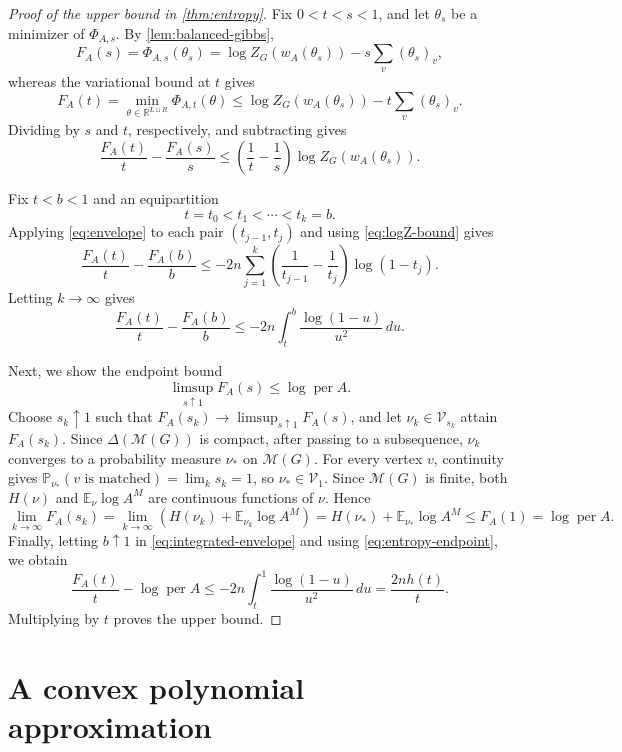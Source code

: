 \documentclass[11pt,reqno,letterpaper]{amsart}
\numberwithin{equation}{section}
\theoremstyle{definition}
\theoremstyle{remark}
\newcommand{\R}{\mathbb R}
\newcommand{\E}{\mathbb E}
\newcommand{\PP}{\mathbb P}
\DeclareMathOperator{\per}{per}
\begin{document}
\begin{proof}[Proof of the upper bound in \cref{thm:entropy}]
Fix $0<t<s<1$, and let $\theta_s$ be a minimizer of
$\Phi_{A,s}$. By \cref{lem:balanced-gibbs},
\[
  F_A(s)
  =\Phi_{A,s}(\theta_s)
  =\log Z_G(w_A(\theta_s))
  -s\sum_v(\theta_s)_v,
\]
whereas the variational bound at $t$ gives
\[
  F_A(t)=\min_{\theta\in\R^{L\sqcup R}}\Phi_{A,t}(\theta)\leq
  \log Z_G(w_A(\theta_s))
  -t\sum_v(\theta_s)_v.
\]
Dividing by $s$ and $t$, respectively, and subtracting gives
\begin{equation}\label{eq:envelope}
  \frac{F_A(t)}{t}-\frac{F_A(s)}{s}
  \leq
  \left(\frac1t-\frac1s\right)
  \log Z_G(w_A(\theta_s)).
\end{equation}

Fix $t<b<1$ and an equipartition
\[
  t=t_0<t_1<\cdots<t_k=b.
\]
Applying \cref{eq:envelope} to each pair
$(t_{j-1},t_j)$ and using \cref{eq:logZ-bound} gives
\[
  \frac{F_A(t)}t-\frac{F_A(b)}b
  \leq
  -2n\sum_{j=1}^k
  \left(\frac1{t_{j-1}}-\frac1{t_j}\right)
  \log(1-t_j).
\]
Letting $k\to\infty$ gives
\begin{equation}\label{eq:integrated-envelope}
  \frac{F_A(t)}t-\frac{F_A(b)}b
  \leq
  -2n\int_t^b\frac{\log(1-u)}{u^2}\,du.
\end{equation}

Next, we show the endpoint bound
\begin{equation}\label{eq:entropy-endpoint}
  \limsup_{s\uparrow1}F_A(s)\leq\log\per A.
\end{equation}
Choose $s_k\uparrow1$ such that
$F_A(s_k)\to\limsup_{s\uparrow1}F_A(s)$, and let
$\nu_k\in\mathcal V_{s_k}$ attain $F_A(s_k)$. Since
$\Delta(\mathcal M(G))$ is compact, after passing to a subsequence,
$\nu_k$ converges to a probability measure $\nu_*$ on $\mathcal M(G)$.
For every vertex $v$, continuity gives
$\PP_{\nu_*}(v\text{ is matched})=\lim_k s_k=1$, so $\nu_*\in\mathcal V_1$.
Since $\mathcal M(G)$ is finite, both $H(\nu)$ and $\E_{\nu}\log A^M$ are continuous functions of $\nu$. Hence
\[
  \lim_{k\to\infty}F_A(s_k)
  =
  \lim_{k\to\infty}
  \left(
    H(\nu_k)+\E_{\nu_k}\log A^M
  \right)
  =
  H(\nu_*)+\E_{\nu_*}\log A^M \leq F_A(1) = \log \per A.
\]
Finally, letting $b\uparrow1$ in \cref{eq:integrated-envelope} and using \cref{eq:entropy-endpoint}, we obtain
\[
  \frac{F_A(t)}t-\log\per A
  \leq
  -2n\int_t^1\frac{\log(1-u)}{u^2}\,du
  =
  \frac{2nh(t)}t.
\]
Multiplying by $t$ proves the upper bound.
\end{proof}

\section{A convex polynomial approximation}\label{sec:convex-approximation}
\end{document}
